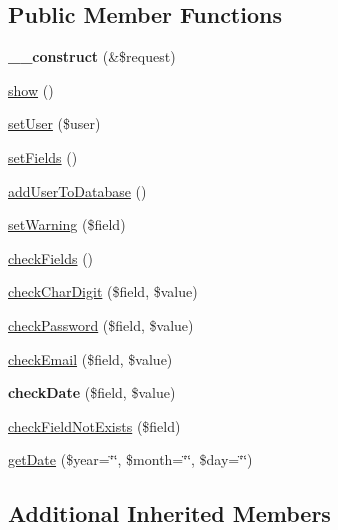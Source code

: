 \subsection*{Public Member Functions}
\begin{DoxyCompactItemize}
\item 
\hypertarget{classSignUpModel_aae52ec1db27fb922288ac520b878f26a}{{\bfseries \+\_\+\+\_\+construct} (\&\$request)}\label{classSignUpModel_aae52ec1db27fb922288ac520b878f26a}

\item 
\hyperlink{classSignUpModel_a3d80b2fd00a974e0887f595cc7965212}{show} ()
\item 
\hyperlink{classSignUpModel_acd59c8e245153cf560a31aaba4f64773}{set\+User} (\$user)
\item 
\hyperlink{classSignUpModel_adea2bbedb918ea9c7773afdbe364ebed}{set\+Fields} ()
\item 
\hyperlink{classSignUpModel_a93f4575092488361fb4fd5f414ffdb48}{add\+User\+To\+Database} ()
\item 
\hyperlink{classSignUpModel_a3c4428291475bd3312836fa81f1a75c7}{set\+Warning} (\$field)
\item 
\hyperlink{classSignUpModel_a1e62f6ed2749da2c1330748adb9afb03}{check\+Fields} ()
\item 
\hyperlink{classSignUpModel_a9143bf2de7d986b7a87835a305fead69}{check\+Char\+Digit} (\$field, \$value)
\item 
\hyperlink{classSignUpModel_afb9cdf85f663e052513dba210c4c42a3}{check\+Password} (\$field, \$value)
\item 
\hyperlink{classSignUpModel_ac2454823e6ba92643040f0949ea00d7a}{check\+Email} (\$field, \$value)
\item 
\hypertarget{classSignUpModel_a0db60aa03b0f53ae8d8ba41f90117d7a}{{\bfseries check\+Date} (\$field, \$value)}\label{classSignUpModel_a0db60aa03b0f53ae8d8ba41f90117d7a}

\item 
\hyperlink{classSignUpModel_a56bbe709052d4774939c95080251a20f}{check\+Field\+Not\+Exists} (\$field)
\item 
\hyperlink{classSignUpModel_ac147a7f9bf405c3e98fe15f5ebb219ab}{get\+Date} (\$year=\char`\"{}\char`\"{}, \$month=\char`\"{}\char`\"{}, \$day=\char`\"{}\char`\"{})
\end{DoxyCompactItemize}
\subsection*{Additional Inherited Members}



